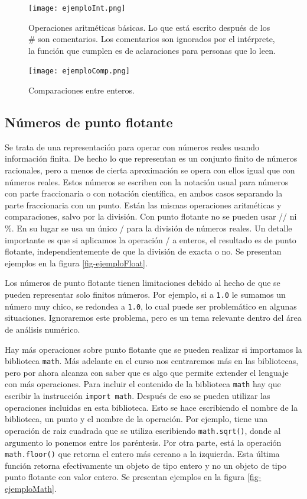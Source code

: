 \documentclass[a4paper, 12pt]{report}
\theoremstyle{definition}
\begin{document}
\begin{figure}
	\centering
	\texttt{[image: ejemploInt.png]}
	\caption{Operaciones aritméticas básicas. Lo que está escrito después de los \# son comentarios. Los comentarios son ignorados por el intérprete, la función que cumplen es de aclaraciones para personas que lo leen.}
	\label{fig-ejemploInt}
\end{figure}

\begin{figure}
	\centering
	\texttt{[image: ejemploComp.png]}
	\caption{Comparaciones entre enteros. }
	\label{fig-ejemploComp}
\end{figure}

\subsection{Números de punto flotante}

Se trata de una representación para operar con números reales usando información finita. De hecho lo que representan es un conjunto finito de números racionales, pero a menos de cierta aproximación se opera con ellos igual que con números reales. Estos números se escriben con la notación usual para números con parte fraccionaria o con notación científica, en ambos casos separando la parte fraccionaria con un punto. Están las mismas operaciones aritméticas y comparaciones, salvo por la división. Con punto flotante no se pueden usar // ni \%. En su lugar se usa un único / para la división de números reales. Un detalle importante es que si aplicamos la operación / a enteros, el resultado es de punto flotante, independientemente de que la división de exacta o no. Se presentan ejemplos en la figura \ref{fig-ejemploFloat}.

Los números de punto flotante tienen limitaciones debido al hecho de que se pueden representar solo finitos números. Por ejemplo, si a {\tt 1.0} le sumamos un número muy chico, se redondea a {\tt 1.0}, lo cual puede ser problemático en algunas situaciones. Ignoraremos este problema, pero es un tema relevante dentro del área de análisis numérico.

Hay más operaciones sobre punto flotante que se pueden realizar si importamos la biblioteca {\tt math}. Más adelante en el curso nos centraremos más en las bibliotecas, pero por ahora alcanza con saber que es algo que permite extender el lenguaje con más operaciones. Para incluir el contenido de la biblioteca {\tt math} hay que escribir la instrucción {\tt import math}. Después de eso se pueden utilizar las operaciones incluidas en esta biblioteca. Esto se hace escribiendo el nombre de la biblioteca, un punto y el nombre de la operación. Por ejemplo, tiene una operación de raiz cuadrada que se utiliza escribiendo {\tt math.sqrt()}, donde al argumento lo ponemos entre los paréntesis. Por otra parte, está la operación {\tt math.floor()} que retorna el entero más cercano a la izquierda. Esta última función retorna efectivamente un objeto de tipo entero y no un objeto de tipo punto flotante con valor entero. Se presentan ejemplos en la figura \ref{fig-ejemploMath}.
\end{document}
